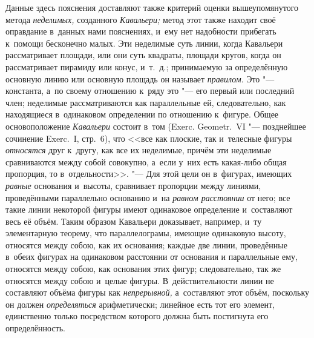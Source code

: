 Данные здесь пояснения доставляют также критерий оценки вышеупомянутого метода
{\em неделимых,} созданного {\em Кавальери;} метод этот также находит своё
оправдание в~данных нами пояснениях, и~ему нет надобности прибегать к~помощи
бесконечно малых. Эти неделимые суть линии, когда Кавальери рассматривает
площади, или они суть квадраты, площади кругов, когда он рассматривает пирамиду
или конус, и~т.~д.; принимаемую за определённую основную линию или основную
площадь он называет {\em правилом}. Это "--- константа, а~по своему отношению
к~ряду это "--- его первый или последний член; неделимые рассматриваются как
параллельные ей, следовательно, как находящиеся в~одинаковом определении по
отношению к~фигуре. Общее основоположение {\em Кавальери} состоит в~том (Exerc.
Geo\-metr.~VI "--- позднейшее сочинение Exerc.~I, стр.~6), что <<все как
плоские, так и~телесные фигуры {\em относятся} друг к~другу, как все их
неделимые, причём эти неделимые сравниваются между собой
совокупно, а~если у~них есть какая-либо общая пропорция, то в~отдельности>>.
"--- Для этой цели он в~фигурах, имеющих {\em равные} основания и~высоты,
сравнивает пропорции между линиями, проведёнными параллельно основанию и~на
{\em равном расстоянии} от него; все такие линии некоторой фигуры имеют
одинаковое определение и~составляют весь её объём. Таким образом Кавальери
доказывает, например, и~ту элементарную теорему, что параллелограмы, имеющие
одинаковую высоту, относятся между собою, как их основания; каждые две линии,
проведённые в~обеих фигурах на одинаковом расстоянии от основания и
параллельные ему, относятся между собою, как основания этих фигур;
следовательно, так же относятся между собою и~целые фигуры. В~действительности
линии не составляют объёма фигуры как {\em непрерывной,} а~составляют этот
объём, поскольку он должен {\em определяться} арифметически; линейное есть тот
его элемент, единственно только посредством которого должна быть постигнута его
определённость.

